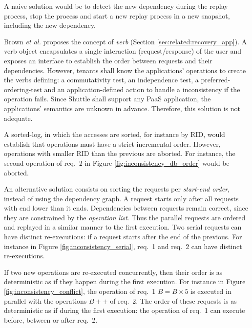 A naive solution would be to detect the new dependency during the replay process, stop the process and start a new replay process in a new snapshot, including the new dependency.

Brown \textit{et al.} \cite{undoForOperators} proposes the concept of \textit{verb} (Section \ref{sec:related:recovery_app}). A verb object encapsulates a single interaction (request/response) of the user and exposes an interface to establish the order between requests and their dependencies. However, tenants shall know the applications' operations to create the verbs defining: a commutativity test, an independence test, a preferred-ordering-test and an application-defined action to handle a inconsistency if the operation fails. Since Shuttle shall support any \ac{PaaS} application, the applications' semantics are unknown in advance. Therefore, this solution is not adequate.

A sorted-log, in which the accesses are sorted, for instance by \acf{RID}, would establish that operations must have a strict incremental order. However, operations with smaller \ac{RID} than the previous are aborted. For instance, the second operation of {req.~2} in Figure \ref{fig:inconsistency_db_order} would be aborted.

An alternative solution consists on sorting the requests per \emph{start-end order}, instead of using the dependency graph. A request starts only after all requests with end lower than it ends. Dependencies between requests remain correct, since they are constrained by the \emph{operation list}. Thus the parallel requests are ordered and replayed in a similar manner to the first execution. Two serial requests can have distinct re-executions: if a request starts after the end of the previous. For instance in Figure \ref{fig:inconsistency_serial}, {req.~1} and {req.~2} can have distinct re-executions.

If two new operations are re-executed concurrently, then their order is as deterministic as if they happen during the first execution. For instance in Figure \ref{fig:inconsistency_conflict}, the operation of {req.~1} $B = B \times 5$ is executed in parallel with the operations $B++$ of {req.~2}. The order of these requests is as deterministic as if during the first execution: the operation of {req.~1} can execute before, between or after {req.~2}.


